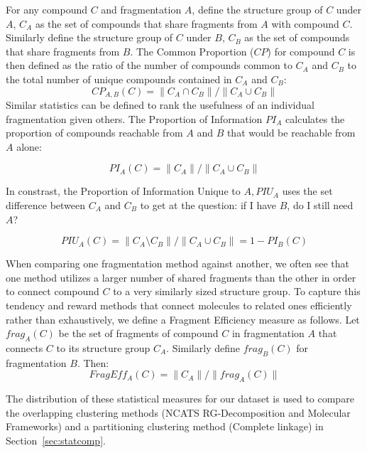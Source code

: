 \documentclass[journal=jacsat,biochem,manuscript=article]{achemso}
\newcommand*\sref[1]{Section~\ref{sec:#1}}
\begin{document}
For any compound $C$ and fragmentation $A$, define the structure group of
$C$ under $A$, $C_A$ as the set of compounds that share fragments from
$A$ with compound $C$. Similarly define the structure group of $C$
under $B$, $C_B$ as the set of compounds that share fragments from
$B$. The Common Proportion ($CP$) for compound $C$ is then defined as
the ratio of the number of compounds common to $C_A$ and $C_B$ to the
total number of unique compounds contained in $C_A$ and $C_B$:
\begin{equation}
CP_{A,B}(C) = \| C_A \cap C_B \| / \| C_A \cup C_B \|
\end{equation}
Similar statistics can be defined to rank the usefulness of an
individual fragmentation given others. The Proportion of Information
$PI_A$ calculates the proportion of compounds reachable from $A$ and
$B$ that would be reachable from $A$ alone:

\begin{equation}
PI_A(C) = \| C_A \| / \| C_A \cup C_B \|
\end{equation}

In constrast, the Proportion of Information Unique to $A, PIU_A$ uses the set difference between $C_A$ and $C_B$ to get at the question: if I have $B$, do I still need $A$? 

\begin{equation}
 PIU_A(C) = \| C_A \setminus C_B \| / \| C_A \cup C_B \| = 1 - PI_B(C)
 \end{equation}
  
 When comparing one fragmentation method against another, we often see
 that one method utilizes a larger number of shared fragments than the
 other in order to connect compound $C$ to a very similarly sized
 structure group. To capture this tendency and reward methods that
 connect molecules to related ones efficiently rather than
 exhaustively, we define a Fragment Efficiency measure as follows. Let
 $frag_A(C)$ be the set of fragments of compound $C$ in fragmentation
 $A$ that connects $C$ to its structure group $C_A$. Similarly define
 $frag_B(C)$ for fragmentation $B$. Then:
\begin{equation}
FragEff_A(C) = \| C_A \| / \| frag_A(C) \|
\end{equation}


The distribution of these statistical measures for our dataset is
used to compare the overlapping clustering methods (NCATS RG-Decomposition and Molecular Frameworks) and a partitioning clustering method (Complete linkage) in \sref{statcomp}.
\end{document}
